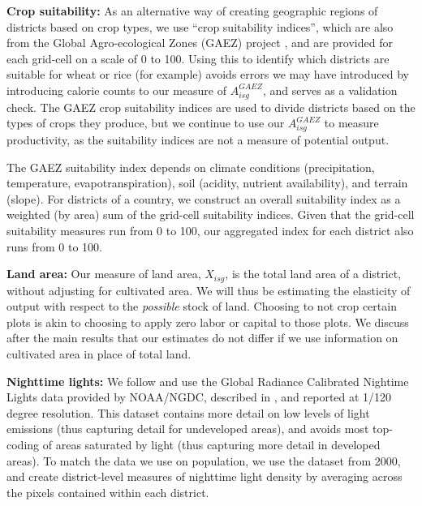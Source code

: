 \documentclass[11pt]{article}
\begin{document}
\vspace{.5cm}\noindent\textbf{Crop suitability:} As an alternative way of creating geographic regions of districts based on crop types, we use ``crop suitability indices'', which are also from the Global Agro-ecological Zones (GAEZ) project \citep{gaez}, and are provided for each grid-cell on a scale of 0 to 100. Using this to identify which districts are suitable for wheat or rice (for example) avoids errors we may have introduced by introducing calorie counts to our measure of $A^{GAEZ}_{isg}$, and serves as a validation check. The GAEZ crop suitability indices are used to divide districts based on the types of crops they produce, but we continue to use our $A^{GAEZ}_{isg}$ to measure productivity, as the suitability indices are not a measure of potential output.

The GAEZ suitability index depends on climate conditions (precipitation, temperature, evapotranspiration), soil (acidity, nutrient availability), and terrain (slope). For districts of a country, we construct an overall suitability index as a weighted (by area) sum of the grid-cell suitability indices. Given that the grid-cell suitability measures run from 0 to 100, our aggregated index for each district also runs from 0 to 100.

\vspace{.5cm}\noindent\textbf{Land area:} Our measure of land area, $X_{isg}$, is the total land area of a district, without adjusting for cultivated area. We will thus be estimating the elasticity of output with respect to the \textit{possible} stock of land. Choosing to not crop certain plots is akin to choosing to apply zero labor or capital to those plots. We discuss after the main results that our estimates do not differ if we use information on cultivated area in place of total land.

\vspace{.5cm}\noindent\textbf{Nighttime lights:} We follow \citet{hssw2016} and use the Global Radiance Calibrated Nightime Lights data provided by NOAA/NGDC, described in \citet{Elvidge1999}, and reported at 1/120 degree resolution. This dataset contains more detail on low levels of light emissions (thus capturing detail for undeveloped areas), and avoids most top-coding of areas saturated by light (thus capturing more detail in developed areas). To match the data we use on population, we use the dataset from 2000, and create district-level measures of nighttime light density by averaging across the pixels contained within each district.
\end{document}
